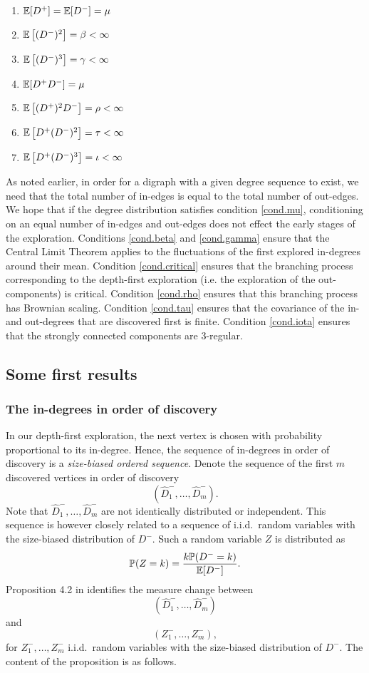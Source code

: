\begin{enumerate}
    \item \label{cond.mu}${\mathbb E}[D^+]={\mathbb E}[D^-]=\mu$
    \item \label{cond.beta}${\mathbb E}\left[(D^-)^2\right]=\beta<\infty$
     \item \label{cond.gamma}${\mathbb E}\left[(D^-)^3\right]=\gamma<\infty$   \item \label{cond.critical} ${\mathbb E}[D^+ D^-]=\mu$
    \item \label{cond.rho} ${\mathbb E}\left[(D^+)^2 D^-\right]=\rho<\infty$
      \item \label{cond.tau} ${\mathbb E}\left[D^+ (D^-)^2\right]=\tau<\infty$
      \item \label{cond.iota} ${\mathbb E}\left[D^+(D^-)^3\right]=\iota<\infty$
\end{enumerate}
\begin{remark}
As noted earlier, in order for a digraph with a given degree sequence to exist, we need that the total number of in-edges is equal to the total number of out-edges. We hope that if the degree distribution satisfies condition \ref{cond.mu}, conditioning on an equal number of in-edges and out-edges does not effect the early stages of the exploration. 
Conditions \ref{cond.beta} and \ref{cond.gamma} ensure that the Central Limit Theorem applies to the fluctuations of the first explored in-degrees around their mean. Condition \ref{cond.critical} ensures that the branching process corresponding to the depth-first exploration (i.e. the exploration of the out-components) is critical. Condition \ref{cond.rho} ensures that this branching process has Brownian scaling. Condition \ref{cond.tau} ensures that the covariance of the in- and out-degrees that are discovered first is finite. Condition \ref{cond.iota} ensures that the strongly connected components are $3$-regular. 
\end{remark}

\subsection{Some first results}
\subsubsection{The in-degrees in order of discovery}
In our depth-first exploration, the next vertex is chosen with probability proportional to its in-degree. Hence, the sequence of in-degrees in order of discovery is a \emph{size-biased ordered sequence}. Denote the sequence of the first $m$ discovered vertices in order of discovery
$$(\hat{D}^-_1,\dots, \hat{D}^-_m).$$ Note that $\hat{D}_1^-,\dots , \hat{D}_m^-$ are not identically distributed or independent. This sequence is however closely related to a sequence of i.i.d.\ random variables with the size-biased distribution of $D^-$. Such a random variable $Z$ is distributed as $${\mathbb P}(Z=k)=\frac{k{\mathbb P}(D^-=k)}{{\mathbb E}[D^-]}.$$
Proposition 4.2 in \cite{Conchon2018} identifies the measure change between $$(\hat{D}^-_1,\dots, \hat{D}^-_m)$$ and $$(Z_1^-,\dots,Z_m^-),$$ for $Z_1^-,\dots,Z_m^-$ i.i.d.\ random variables with the size-biased distribution of $D^-$. The content of the proposition is as follows.

